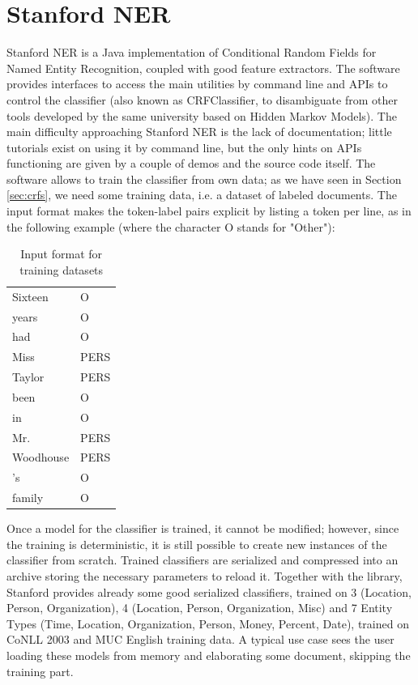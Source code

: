 \documentclass[a4paper,11pt]{report}
\begin{document}
\section{Stanford NER}
\label{sec:StfdNER}
Stanford NER \cite{finkel2005incorporating} is a Java implementation of Conditional Random Fields for Named Entity Recognition, coupled with good feature extractors. The software provides interfaces to access the main utilities by command line and APIs to control the classifier (also known as CRFClassifier, to disambiguate from other tools developed by the same university based on Hidden Markov Models).
The main difficulty approaching Stanford NER is the lack of documentation; little tutorials exist on using it by command line, but the only hints on APIs functioning are given by a couple of demos and the source code itself.
The software allows to train the classifier from own data; as we have seen in Section \ref{sec:crfs}, we need some training data, i.e. a dataset of labeled documents. The input format makes the token-label pairs explicit by listing a token per line, as in the following example (where the character O stands for "Other"):\\
\begin{table}[H]
\begin{center}
\begin{tabular}{ll}
Sixteen &	O\\
years	& O\\
had	&O\\
Miss	&PERS\\
Taylor	&PERS\\
been	&O\\
in	&O\\
Mr.	&PERS\\
Woodhouse	&PERS\\
's	&O\\
family	&O\\
\end{tabular}
\end{center}
\caption{Input format for training datasets}
\label{tab:inputfmt}
\end{table}
Once a model for the classifier is trained, it cannot be modified; however, since the training is deterministic, it is still possible to create new instances of the classifier from scratch. Trained classifiers are serialized and compressed into an archive storing the necessary parameters to reload it.
Together with the library, Stanford provides already some good serialized classifiers, trained on 3 (Location, Person, Organization), 4 (Location, Person, Organization, Misc) and 7 Entity Types (Time, Location, Organization, Person, Money, Percent, Date), trained on CoNLL 2003 and MUC English training data. A typical use case sees the user loading these models from memory and elaborating some document, skipping the training part.
\end{document}

